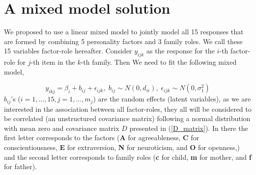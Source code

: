 \documentclass[11pt,a5paper,twoside]{book}
\begin{document}
\section{A mixed model solution}

We proposed to use a linear mixed model to jointly model all 15 responses that are formed by combining 5 personality factors and 3 family roles. We call these 15 variables factor-role hereafter. Consider $y_{ijk}$ as the response for the $i$-th factor-role for $j$-th item in the $k$-th family. Then We need to fit the following mixed model,

\begin{equation}
\label{main_model}
y_{ikj}=\beta_i + b_{ij} + \epsilon_{ijk},\;b_{ij}\sim N(0,d_{ii}),\;\epsilon_{ijk}\sim N(0,\sigma_1^2)
\end{equation}
$b_{ij}$'s ($i=1,\ldots,15, j=1,\ldots,m_j$) are the random effects (latent variables), as we are interested in the association between all factor-roles, they all will be considered to be correlated (an unstructured covariance matrix) following a normal distribution with mean zero and covariance matrix $D$ presented in (\ref{D_matrix}). In there the first letter corresponds to the factors (\textbf{A} for agreeableness, \textbf{C} for conscientiousness, \textbf{E} for extraversion, \textbf{N} for neuroticism, and \textbf{O} for openness,) and the second letter corresponds to family roles (\textbf{c} for child, \textbf{m} for mother, and \textbf{f} for father).
\end{document}
